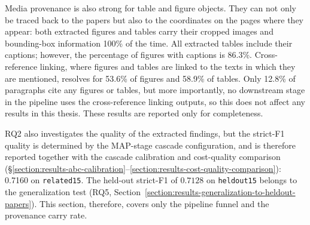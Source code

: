 Media provenance is also strong for table and figure objects. They can not only be traced back to the papers but also to the coordinates on the pages where they appear: both extracted figures and tables carry their cropped images and bounding-box information 100\% of the time. All extracted tables include their captions; however, the percentage of figures with captions is 86.3\%. Cross-reference linking, where figures and tables are linked to the texts in which they are mentioned, resolves for 53.6\% of figures and 58.9\% of tables. Only 12.8\% of paragraphs cite any figures or tables, but more importantly, no downstream stage in the pipeline uses the cross-reference linking outputs, so this does not affect any results in this thesis. These results are reported only for completeness. 

RQ2 also investigates the quality of the extracted findings, but the strict-F1 quality is determined by the MAP-stage cascade configuration, and is therefore reported together with the cascade calibration and cost-quality comparison (§\ref{section:results-abc-calibration}--\ref{section:results-cost-quality-comparison}): 0.7160 on \texttt{related15}. The held-out strict-F1 of $0.7128$ on \texttt{heldout15} belongs to the generalization test (RQ5, Section~\ref{section:results-generalization-to-heldout-papers}). This section, therefore, covers only the pipeline funnel and the provenance carry rate.